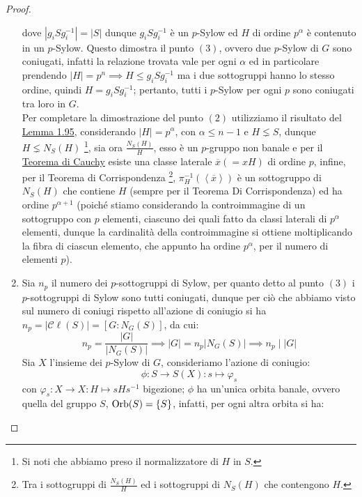 \documentclass[11pt]{scrartcl}
\begin{document}
\begin{proof}
\begin{enumerate}[(1)]
\[                    \]
                dove $|g_iSg_i^{-1}| = |S|$ dunque $g_iSg_i^{-1}$ è un $p$-Sylow ed $H$ di ordine $p^{\alpha}$ è contenuto in un $p$-Sylow. Questo dimostra il punto $(3)$,
                ovvero due $p$-Sylow di $G$ sono coniugati, infatti la relazione trovata vale per ogni $\alpha$ ed in particolare prendendo $|H| = p^n \implies H \leqslant g_iSg_{i}^{-1}$ ma
                i due sottogruppi hanno lo stesso ordine, quindi $H = g_iSg_{i}^{-1}$; pertanto, tutti i $p$-Sylow per ogni $p$ sono coniugati tra loro in $G$. \\
                Per completare la dimostrazione del punto $(2)$ utilizziamo il risultato del \hyperref[l:1.95]{Lemma 1.95}, considerando $|H| = p^{\alpha}$, con $\alpha \leq n - 1$ e $H \lneq S$, dunque $H \lneq N_S(H)$ \footnote{Si noti che abbiamo preso il normalizzatore di $H$ in $S$.},
                sia ora $\frac{N_{S}(H)}{H}$, esso è un $p$-gruppo non banale e per il \hyperref[p:Cauchy]{Teorema di Cauchy} esiste una classe laterale $\overline x (= xH)$ di ordine $p$, infine, per il Teorema di Corrispondenza \footnote{Tra i sottogruppi di $\frac{N_{S}(H)}{H}$ ed i sottogruppi di $N_{S}(H)$ che contengono $H$.},
                $\pi^{-1}_H(\left<\overline x\right>)$ è un sottogruppo di $N_S(H)$ che contiene $H$ (sempre per il Teorema Di Corrispondenza) ed ha ordine $p^{\alpha+1}$ (poiché stiamo considerando la controimmagine di un sottogruppo con $p$ elementi,
                ciascuno dei quali fatto da classi laterali di $p^{\alpha}$ elementi, dunque la cardinalità della controimmagine si ottiene moltiplicando la fibra di ciascun elemento, che appunto ha ordine $p^{\alpha}$, per il numero di elementi $p$).
            \item Sia $n_p$ il numero dei $p$-sottogruppi di Sylow, per quanto detto al punto $(3)$ i $p$-sottogruppi di Sylow sono tutti coniugati,
            dunque per ciò che abbiamo visto sul numero di coniugi rispetto all'azione di coniugio si ha $n_p = |\mathcal{C}\ell(S)|=[G:N_G(S)]$, da cui:
                        \[ n_p = \frac{|G|}{|N_G(S)|} \implies |G| = n_p|N_G(S)| \implies n_p \mid |G|
                            \]
                Sia $X$ l'insieme dei $p$-Sylow di $G$, consideriamo l'azione di coniugio:
                    \[ \phi : S \longrightarrow S(X) : s \longmapsto \varphi_s
                        \]
                con $\varphi_s : X \longrightarrow X : H \longmapsto sHs^{-1}$ bigezione; $\phi$ ha un'unica orbita banale, ovvero quella del gruppo $S$, $\operatorname{Orb}(S) = \{S\}$, infatti, per ogni altra orbita si ha:

\end{enumerate}
\end{proof}
\end{document}
